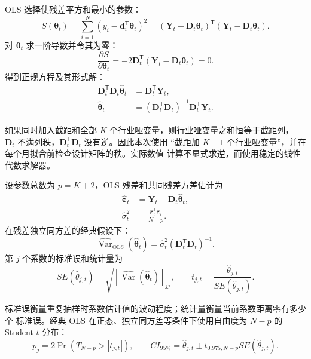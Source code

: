 \documentclass[UTF8,a4paper,11pt]{ctexart}
\begin{document}
OLS 选择使残差平方和最小的参数：
\begin{equation}
  S(\bm{\theta}_t)
  =\sum_{i=1}^{N}(y_i-\bm{d}_i^{\mathsf T}\bm{\theta}_t)^2
  =(\bm{Y}_t-\bm{D}_t\bm{\theta}_t)^{\mathsf T}
   (\bm{Y}_t-\bm{D}_t\bm{\theta}_t).
\end{equation}
对 $\bm{\theta}_t$ 求一阶导数并令其为零：
\begin{equation}
  \frac{\partial S}{\partial\bm{\theta}_t}
  =-2\bm{D}_t^{\mathsf T}
  (\bm{Y}_t-\bm{D}_t\bm{\theta}_t)=0.
\end{equation}
得到正规方程及其形式解：
\begin{align}
  \bm{D}_t^{\mathsf T}\bm{D}_t\widehat{\bm{\theta}}_t
    &=\bm{D}_t^{\mathsf T}\bm{Y}_t,\\
  \widehat{\bm{\theta}}_t
    &=(\bm{D}_t^{\mathsf T}\bm{D}_t)^{-1}
      \bm{D}_t^{\mathsf T}\bm{Y}_t.
\end{align}

如果同时加入截距和全部 $K$ 个行业哑变量，则行业哑变量之和恒等于截距列，
$\bm{D}_t$ 不满列秩，$\bm{D}_t^{\mathsf T}\bm{D}_t$ 没有逆。因此本次使用
“截距加 $K-1$ 个行业哑变量”，并在每个月拟合前检查设计矩阵的秩。实际数值
计算不显式求逆，而使用稳定的线性代数求解器。

设参数总数为 $p=K+2$，OLS 残差和共同残差方差估计为
\begin{align}
  \widehat{\bm{\varepsilon}}_t
    &=\bm{Y}_t-\bm{D}_t\widehat{\bm{\theta}}_t,\\
  \widehat{\sigma}_t^2
    &=\frac{\widehat{\bm{\varepsilon}}_t^{\mathsf T}
      \widehat{\bm{\varepsilon}}_t}{N-p}.
\end{align}
在残差独立同方差的经典假设下：
\begin{equation}
  \widehat{\operatorname{Var}}_{\mathrm{OLS}}
  (\widehat{\bm{\theta}}_t)
  =\widehat{\sigma}_t^2
   (\bm{D}_t^{\mathsf T}\bm{D}_t)^{-1}.
\end{equation}
第 $j$ 个系数的标准误和统计量为
\begin{equation}
  SE(\widehat{\theta}_{j,t})
  =\sqrt{\left[
  \widehat{\operatorname{Var}}(\widehat{\bm{\theta}}_t)
  \right]_{jj}},
  \qquad
  t_{j,t}=\frac{\widehat{\theta}_{j,t}}{SE(\widehat{\theta}_{j,t})}.
\end{equation}

标准误衡量重复抽样时系数估计值的波动程度；统计量衡量当前系数距离零有多少个
标准误。经典 OLS 在正态、独立同方差等条件下使用自由度为 $N-p$ 的 Student
$t$ 分布：
\begin{equation}
  p_j=2\Pr\!\left(T_{N-p}>|t_{j,t}|\right),
  \qquad
  CI_{95\%}=\widehat{\theta}_{j,t}
  \pm t_{0.975,N-p}SE(\widehat{\theta}_{j,t}).
\end{equation}
\end{document}
